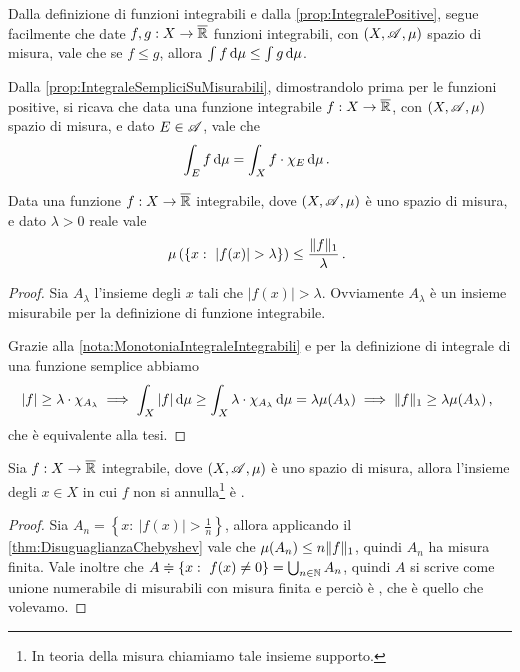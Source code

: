 \begin{remark}\label{nota:MonotoniaIntegraleIntegrabili}
	Dalla definizione di funzioni integrabili e dalla \cref{prop:IntegralePositive}, segue facilmente che date $f,g:X\to\overline{\mathbb R}$ funzioni integrabili, con $(X,\mathscr A,\mu)$ spazio di misura, vale che se $f\le g$, allora $\int f\,\mathrm d\mu\le \int g\,\mathrm d\mu$.
\end{remark}

\begin{remark}\label{nota:IntegraleIntegrabiliSuMisurabili}
	Dalla \cref{prop:IntegraleSempliciSuMisurabili}, dimostrandolo prima per le funzioni positive, si ricava che data una funzione integrabile $f:X\to\overline{\mathbb R}$, con $(X,\mathscr A,\mu)$ spazio di misura, e dato $E\in\mathscr A$, vale che
	\begin{equation*}
		\int_E f \,\mathrm d\mu=\int_X f\cdot\chi_E\,\mathrm d\mu\, \text{. }
	\end{equation*}

\end{remark}



\begin{theorem}\label{thm:DisuguaglianzaChebyshev}
	Data una funzione $f:X\to\overline{\mathbb R}$ integrabile, dove $(X,\mathscr A,\mu)$ è uno spazio di misura, e dato $\lambda>0$ reale vale
	\begin{equation*}
		\mu\left(\left\{x:\ |f(x)|>\lambda\right\}\right) \le \frac{\LNorm f}{\lambda}\punto
	\end{equation*}
\end{theorem}
\begin{proof}
	Sia $A_\lambda$ l'insieme degli $x$ tali che $|f(x)|>\lambda$. Ovviamente $A_\lambda$ è un insieme misurabile per la definizione di funzione integrabile.
	
	Grazie alla \cref{nota:MonotoniaIntegraleIntegrabili} e per la definizione di integrale di una funzione semplice abbiamo
	\begin{equation*}
		|f|\ge\lambda \cdot \chi_{A_\lambda} \implies \int_X |f|\,\mathrm d\mu \ge \int_X \lambda\cdot\chi_{A_\lambda}\,\mathrm d\mu=\lambda\mu(A_\lambda)\implies
		\Vert f\Vert_1\ge \lambda\mu(A_\lambda)\, \text{, }
	\end{equation*}
	che è equivalente alla tesi.
\end{proof}

\begin{corollary}\label{cor:SupportoIntegrabile}
	Sia $f:X\to\overline{\mathbb R}$ integrabile, dove $(X,\mathscr A,\mu)$ è uno spazio di misura, allora l'insieme degli $x\in X$ in cui $f$ non si annulla\footnote{In teoria della misura chiamiamo tale insieme supporto.} è \sigfin[o].
\end{corollary}
\begin{proof}
	Sia $A_n=\left\{x:\ |f(x)|>\frac 1n \right\}$, allora applicando il \cref{thm:DisuguaglianzaChebyshev} vale che $\mu(A_n)\le n \Vert f\Vert_1$, quindi $A_n$ ha misura finita. Vale inoltre che $A\doteqdot\left\{x:\ f(x)\not=0 \right\}=\bigcup_{n\in\mathbb N}A_n$, quindi $A$ si scrive come unione numerabile di misurabili con misura finita e perciò è \sigfin[o], che è quello che volevamo.
\end{proof}



